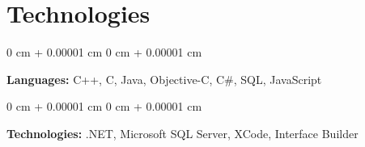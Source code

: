 \documentclass[10pt, letterpaper]{article}
\newenvironment{onecolentry}{
	\begin{adjustwidth}{
			0 cm + 0.00001 cm
		}{
			0 cm + 0.00001 cm
		}
	}{
	\end{adjustwidth}
} %
\begin{document}
	
	
	
	\section{Technologies}
	
	
	
	
	\begin{onecolentry}
		\textbf{Languages:} C++, C, Java, Objective-C, C\#, SQL, JavaScript
	\end{onecolentry}
	
	\vspace{0.2 cm}
	
	\begin{onecolentry}
		\textbf{Technologies:} .NET, Microsoft SQL Server, XCode, Interface Builder
	\end{onecolentry}
	
	
	
	
\end{document}
